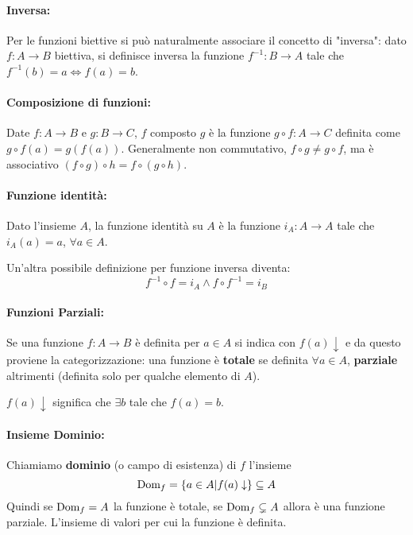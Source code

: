 \paragraph{Inversa:} Per le funzioni biettive si può naturalmente associare il concetto di "inversa": dato $f: A \rightarrow B$ biettiva, si definisce inversa la funzione $f^{-1}: B \rightarrow A$ tale che $f^{-1} (b) = a \Leftrightarrow f(a) = b$.

\paragraph{Composizione di funzioni:} Date $f: A \rightarrow B$ e $g: B \rightarrow C$, $f$ composto $g$ è la funzione $g \circ f: A \rightarrow C$ definita come $g \circ f(a) = g(f(a))$. Generalmente non commutativo, $f \circ g \neq g \circ f$, ma è associativo $(f \circ g) \circ h = f \circ (g \circ h)$.

\paragraph{Funzione identità:} Dato l'insieme $A$, la funzione identità su $A$ è la funzione $i_A: A \rightarrow A$ tale che $i_A (a) = a$, $\forall a \in A$.

Un'altra possibile definizione per funzione inversa diventa:
$$ f^{-1} \circ f = i_A \wedge f \circ f^{-1} = i_B $$

\paragraph{Funzioni Parziali:} Se una funzione $f: A \rightarrow B$ è definita per $a \in A$ si indica con $f(a) \downarrow$ e da questo proviene la categorizzazione: una funzione è \textbf{totale} se definita $\forall a \in A$, \textbf{parziale} altrimenti (definita solo per qualche elemento di $A$).

$f(a) \downarrow$ significa che $\exists b$ tale che $f(a) = b$.

\paragraph{Insieme Dominio:} Chiamiamo \textbf{dominio} (o campo di esistenza) di $f$ l'insieme
$$ \text{Dom}_f = \left\{a \in A | f(a) \downarrow \right\} \subseteq A $$
Quindi se $\text{Dom}_f = A$ la funzione è totale, se $\text{Dom}_f \subsetneq A$ allora è una funzione parziale. L'insieme di valori per cui la funzione è definita.

